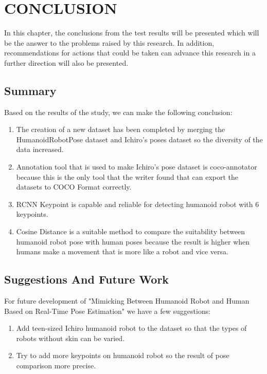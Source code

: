 \chapter{CONCLUSION}
\label{chap:conclusion}

In this chapter, the conclusions from the test results will be presented which will be the answer to the problems raised by this research.
In addition, recommendations for actions that could be taken can advance this research in a further direction will also be presented.

\section{Summary}
\label{sec:summary}

Based on the results of the study, we can make the following conclusion:

\begin{enumerate}[nolistsep]

  \item The creation of a new dataset has been completed by merging the HumanoidRobotPose dataset and Ichiro's poses dataset so the diversity of the data increased.
  \item Annotation tool that is used to make Ichiro's pose dataset is coco-annotator because this is the only tool that the writer found that can export the datasets to COCO Format correctly.
  \item RCNN Keypoint is capable and reliable for detecting humanoid robot with 6 keypoints.
  \item Cosine Distance is a suitable method to compare the suitability between humanoid robot pose with human poses because the result is higher when
  humans make a movement that is more like a robot and vice versa.

\end{enumerate}

\section{Suggestions And Future Work}
\label{chap:suggestionsandfuturework}

For future development of "Mimicking Between Humanoid Robot and Human Based on Real-Time Pose Estimation" we have a few suggestions:

\begin{enumerate}[nolistsep]

  \item Add teen-sized Ichiro humanoid robot to the dataset so that the types of robots without skin can be varied.
  \item Try to add more keypoints on humanoid robot so the result of pose comparison more precise.

\end{enumerate}
